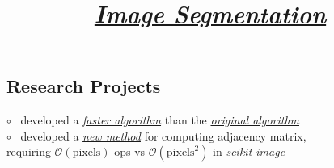 \documentclass[12pt,margintitle,line]{res}
\begin{document}
\begin{resume}
\section{Research Projects}

\vspace{-0.5cm}
\title{
\href{https://github.com/Will-Wright/image-segmentation} {\textsl{Image Segmentation}}
}
\employer{ 
}
\dates{}
\begin{position}

	\begin{figure} 
		\vspace{-0.90cm}
		\hspace{-1.95cm}
 	 	\begin{minipage}[t]{3cm}
  		\end{minipage} 
	\end{figure} 
	
\vspace{-1.25cm}
$\circ$ \ developed a 
\href{https://github.com/Will-Wright/image-segmentation#demo-tutorial} {\textsl{faster algorithm}}
than the 
\href{http://www1.maths.lth.se/matematiklth/vision/publdb/reports/pdf/eriksson-olsson-etal-jmiv-10.pdf} {\textsl{original algorithm}}
	\\
$\circ$ \ developed a
\href{https://github.com/Will-Wright/image-segmentation/blob/master/src/GetAdjMat.py}{\textit{new method}} 
for computing adjacency matrix,
	\\		\hspace*{0.35cm} 
requiring $\mathcal{O}(\text{pixels})$ ops vs $\mathcal{O}(\text{pixels}^2)$ in
\href{https://github.com/scikit-image/scikit-image/blob/master/skimage/future/graph/rag.py}{\textit{scikit-image}} 
\end{position}





\end{resume}
\end{document}
